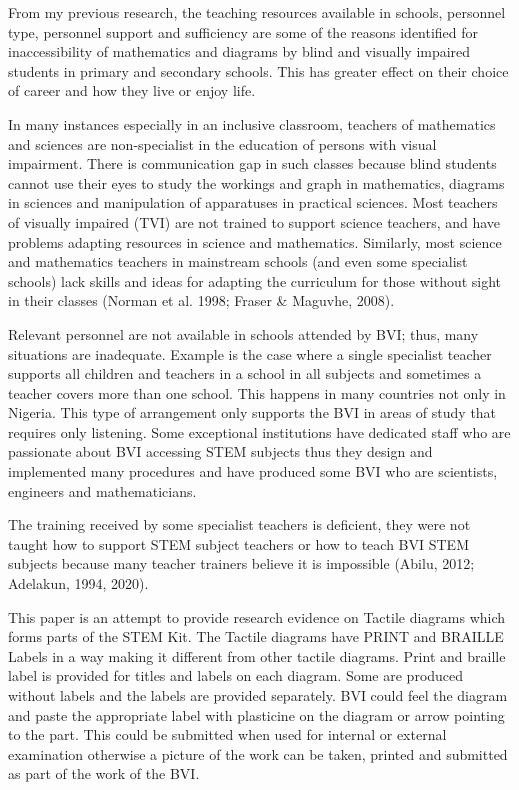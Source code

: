 \documentclass[11.5pt]{sig-alternate} %
\begin{document}
\begin{large}
From my previous research, the teaching resources available in schools, personnel type, personnel support and sufficiency are some of the reasons identified for inaccessibility of mathematics and diagrams by blind and visually impaired students in primary and secondary schools. This has greater effect on their choice of career and how they live or enjoy life.

In many instances especially in an inclusive classroom, teachers of mathematics and sciences are non-specialist in the education of persons with visual impairment. There is communication gap in such classes because blind students cannot use their eyes to study the workings and graph in mathematics, diagrams in sciences and manipulation of apparatuses in practical sciences.  Most teachers of visually impaired (TVI) are not trained to support science teachers, and have problems adapting resources in science and mathematics. Similarly, most science and mathematics teachers in mainstream schools (and even some specialist schools) lack skills and ideas for adapting the curriculum for those without sight in their classes (Norman et al. 1998; Fraser \& Maguvhe, 2008). 

Relevant personnel are not available in schools attended by BVI; thus, many situations are inadequate. Example is the case where a single specialist teacher supports all children and teachers in a school in all subjects and sometimes a teacher covers more than one school. This happens in many countries not only in Nigeria. This type of arrangement only supports the BVI in areas of study that requires only listening. Some exceptional institutions have dedicated staff who are passionate about BVI accessing STEM subjects thus they design and implemented many procedures and have produced some BVI who are scientists, engineers and mathematicians.

The training received by some specialist teachers is deficient, they were not taught how to support STEM subject teachers or how to teach BVI STEM subjects because many teacher trainers believe it is impossible (Abilu, 2012; Adelakun, 1994, 2020).   

This paper is an attempt to provide research evidence on Tactile diagrams which forms parts of the STEM Kit\textcopyright{}. The Tactile diagrams have PRINT and BRAILLE Labels in a way making it different from other tactile diagrams. Print and braille label is provided for titles and labels on each diagram. Some are produced without labels and the labels are provided separately. BVI could feel the diagram and paste the appropriate label with plasticine on the diagram or arrow pointing to the part. This could be submitted when used for internal or external examination otherwise a picture of the work can be taken, printed and submitted as part of the work of the BVI. 



\end{large}
\end{document}
